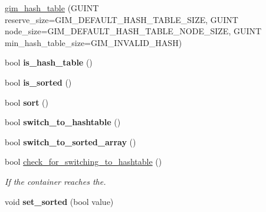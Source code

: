 \begin{DoxyCompactItemize}
\item 
\hyperlink{classgim__hash__table_aefe21c907c69c8077ec0886aaa778f6f}{gim\+\_\+hash\+\_\+table} (G\+U\+I\+N\+T reserve\+\_\+size=G\+I\+M\+\_\+\+D\+E\+F\+A\+U\+L\+T\+\_\+\+H\+A\+S\+H\+\_\+\+T\+A\+B\+L\+E\+\_\+\+S\+I\+Z\+E, G\+U\+I\+N\+T node\+\_\+size=G\+I\+M\+\_\+\+D\+E\+F\+A\+U\+L\+T\+\_\+\+H\+A\+S\+H\+\_\+\+T\+A\+B\+L\+E\+\_\+\+N\+O\+D\+E\+\_\+\+S\+I\+Z\+E, G\+U\+I\+N\+T min\+\_\+hash\+\_\+table\+\_\+size=G\+I\+M\+\_\+\+I\+N\+V\+A\+L\+I\+D\+\_\+\+H\+A\+S\+H)
\item 
\hypertarget{classgim__hash__table_ab7ab2e3e9ac09ec98d5c7112ea092aad}{bool {\bfseries is\+\_\+hash\+\_\+table} ()}\label{classgim__hash__table_ab7ab2e3e9ac09ec98d5c7112ea092aad}

\item 
\hypertarget{classgim__hash__table_a075a9857030ef2630d036b57778e2a46}{bool {\bfseries is\+\_\+sorted} ()}\label{classgim__hash__table_a075a9857030ef2630d036b57778e2a46}

\item 
\hypertarget{classgim__hash__table_adc65cdfbdb6906e4d0ebf66766f65557}{bool {\bfseries sort} ()}\label{classgim__hash__table_adc65cdfbdb6906e4d0ebf66766f65557}

\item 
\hypertarget{classgim__hash__table_a02b51868862156240818dafe2f8df01d}{bool {\bfseries switch\+\_\+to\+\_\+hashtable} ()}\label{classgim__hash__table_a02b51868862156240818dafe2f8df01d}

\item 
\hypertarget{classgim__hash__table_acf8117de90e6486e712fc6184ea40225}{bool {\bfseries switch\+\_\+to\+\_\+sorted\+\_\+array} ()}\label{classgim__hash__table_acf8117de90e6486e712fc6184ea40225}

\item 
\hypertarget{classgim__hash__table_aba33eeb9b5aa00b0d8a002c549b71ed3}{bool \hyperlink{classgim__hash__table_aba33eeb9b5aa00b0d8a002c549b71ed3}{check\+\_\+for\+\_\+switching\+\_\+to\+\_\+hashtable} ()}\label{classgim__hash__table_aba33eeb9b5aa00b0d8a002c549b71ed3}

\begin{DoxyCompactList}\small\item\em If the container reaches the. \end{DoxyCompactList}\item 
\hypertarget{classgim__hash__table_abe1662ebb0f7a17a84e7fc5d0f993c58}{void {\bfseries set\+\_\+sorted} (bool value)}\label{classgim__hash__table_abe1662ebb0f7a17a84e7fc5d0f993c58}


\end{DoxyCompactItemize}
